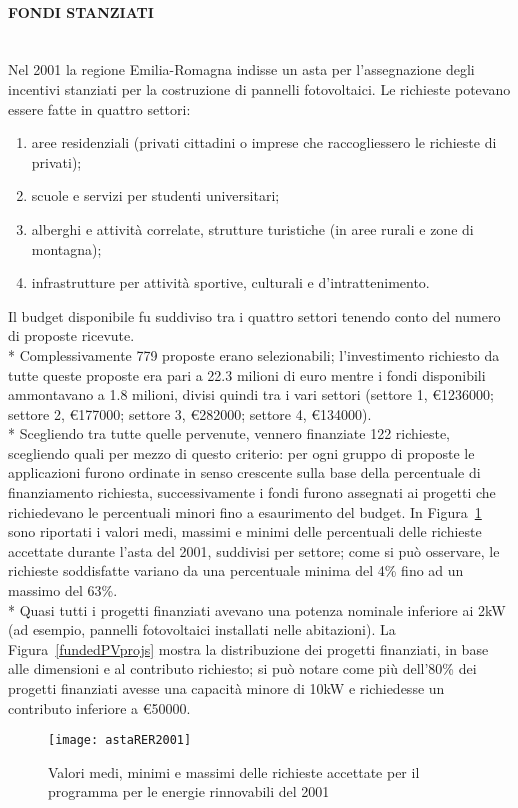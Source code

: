 \documentclass[12pt,a4paper,openright,twoside]{report}
\newcommand{\myparagraph}[1]{\paragraph{#1}\mbox{}\\}
\begin{document}
\myparagraph{FONDI STANZIATI}
Nel 2001 la regione Emilia-Romagna indisse un asta per l'assegnazione degli incentivi stanziati per la costruzione di pannelli fotovoltaici. Le richieste potevano essere fatte in quattro settori:
\begin{enumerate}
\item aree residenziali (privati cittadini o imprese che raccogliessero le richieste di privati);
\item scuole e servizi per studenti universitari;
\item alberghi e attività correlate, strutture turistiche (in aree rurali e zone di montagna);
\item infrastrutture per attività sportive, culturali e d'intrattenimento. 
\end{enumerate}
Il budget disponibile fu suddiviso tra i quattro settori tenendo conto del numero di proposte ricevute.\\*
Complessivamente 779 proposte erano selezionabili; l'investimento richiesto da tutte queste proposte era pari a 22.3 milioni di euro mentre i fondi disponibili ammontavano a 1.8 milioni, divisi quindi tra i vari settori (settore 1, \euro1236000; settore 2, \euro177000; settore 3, \euro282000; settore 4, \euro134000).\\*
Scegliendo tra tutte quelle pervenute, vennero finanziate 122 richieste, scegliendo quali per mezzo di questo criterio: per ogni gruppo di proposte le applicazioni furono ordinate in senso crescente sulla base della percentuale di finanziamento richiesta, successivamente i fondi furono assegnati ai progetti che richiedevano le percentuali minori fino a esaurimento del budget. In Figura~\ref{astaRER2001} sono riportati i valori medi, massimi e minimi delle percentuali delle richieste accettate durante l'asta del 2001, suddivisi per settore; come si può osservare, le richieste soddisfatte variano da una percentuale minima del 4\% fino ad un massimo del 63\%. \\*
Quasi tutti i progetti finanziati avevano una potenza nominale inferiore ai 2kW (ad esempio, pannelli fotovoltaici installati nelle abitazioni). La Figura~\ref{fundedPVprojs} mostra la distribuzione dei progetti finanziati, in base alle dimensioni e al contributo richiesto; si può notare come più dell'80\% dei progetti finanziati avesse una capacità minore di 10kW e richiedesse un contributo inferiore a \euro50000.

\begin{figure}[hbt]
	\centering
	\texttt{[image: astaRER2001]}
	\caption{Valori medi, minimi e massimi delle richieste accettate per il programma per le energie rinnovabili del 2001}
	\label{astaRER2001}
\end{figure}
\end{document}

